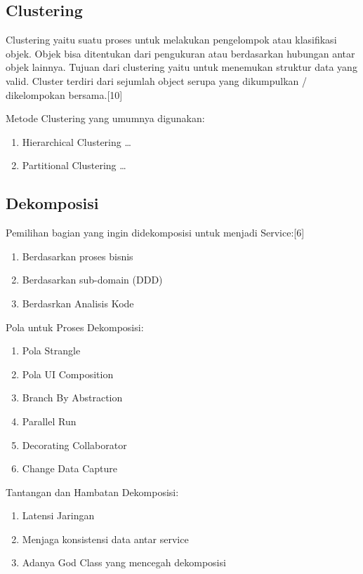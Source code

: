 \subsection{Clustering}
Clustering yaitu suatu proses untuk melakukan pengelompok atau klasifikasi objek. Objek bisa ditentukan dari pengukuran atau berdasarkan hubungan antar objek lainnya. Tujuan dari clustering yaitu untuk  menemukan struktur data yang valid. Cluster terdiri dari sejumlah object serupa yang dikumpulkan / dikelompokan bersama.[10]

Metode Clustering yang umumnya digunakan:
\begin{enumerate}[leftmargin=1.3cm]
	\item Hierarchical Clustering
	…
	\item Partitional Clustering
	…
	
\end{enumerate}	
\subsection{Dekomposisi}
Pemilihan bagian yang ingin didekomposisi untuk menjadi Service:[6]
\begin{enumerate}[leftmargin=1.3cm]
	\item Berdasarkan proses bisnis
	\item Berdasarkan sub-domain (DDD)
	\item Berdasrkan Analisis Kode
\end{enumerate}	

Pola untuk Proses Dekomposisi:
\begin{enumerate}[leftmargin=1.3cm]
	\item Pola Strangle 
	\item Pola UI Composition
	\item Branch By Abstraction
	\item Parallel Run
	\item Decorating Collaborator
	\item Change Data Capture
\end{enumerate}	

Tantangan dan Hambatan Dekomposisi:
\begin{enumerate}[leftmargin=1.3cm]
	\item Latensi Jaringan
	\item Menjaga konsistensi data antar service
	\item Adanya God Class yang mencegah dekomposisi
\end{enumerate}	

